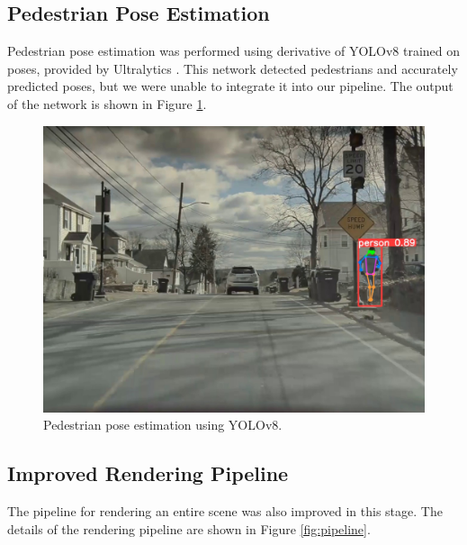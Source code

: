 \subsection{Pedestrian Pose Estimation}
Pedestrian pose estimation was performed using derivative of YOLOv8 trained on poses, provided by Ultralytics \cite{YOLOv8Pose}. This network detected pedestrians and accurately predicted poses, but we were unable to integrate it into our pipeline. The output of the network is shown in Figure \ref{fig:pedestrian_pose}.

\begin{figure}
  \centering
  \includegraphics[width=0.95\linewidth]{images/pedestrian_pose.jpg}
  \caption{Pedestrian pose estimation using YOLOv8.}
  \label{fig:pedestrian_pose}
\end{figure}

\subsection{Improved Rendering Pipeline}
The pipeline for rendering an entire scene was also improved in this stage. The details of the rendering pipeline are shown in Figure \ref{fig:pipeline}.

